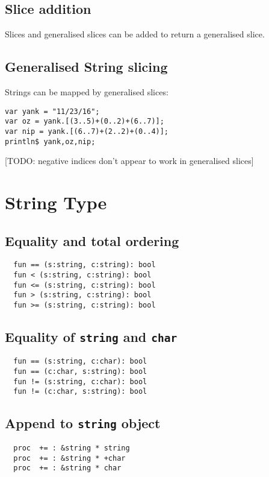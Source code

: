 \documentclass[oneside]{book}
\begin{document}
\subsection{Slice addition}
Slices and generalised slices can be added to return a generalised slice.

\subsection{Generalised String slicing}
Strings can be mapped by generalised slices:

\begin{verbatim}
var yank = "11/23/16";
var oz = yank.[(3..5)+(0..2)+(6..7)];
var nip = yank.[(6..7)+(2..2)+(0..4)];
println$ yank,oz,nip;
\end{verbatim}

[TODO: negative indices don't appear to work in
generalised slices]


\section{String Type}
\subsection{Equality and total ordering}
\begin{verbatim}
  fun == (s:string, c:string): bool
  fun < (s:string, c:string): bool
  fun <= (s:string, c:string): bool
  fun > (s:string, c:string): bool
  fun >= (s:string, c:string): bool
\end{verbatim}

\subsection{Equality of {\tt string} and {\tt char}}
\begin{verbatim}
  fun == (s:string, c:char): bool
  fun == (c:char, s:string): bool
  fun != (s:string, c:char): bool
  fun != (c:char, s:string): bool
\end{verbatim}

\subsection{Append to {\tt string} object}
\begin{verbatim}
  proc  += : &string * string 
  proc  += : &string * +char
  proc  += : &string * char
\end{verbatim}
\end{document}
